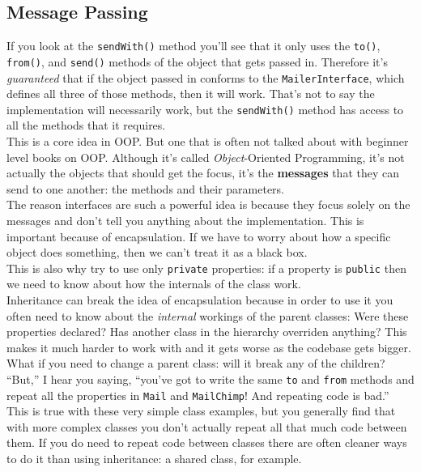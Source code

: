 \subsection{Message Passing}

If you look at the \texttt{sendWith()} method you'll see that it only uses the \texttt{to()}, \texttt{from()}, and \texttt{send()} methods of the object that gets passed in. Therefore it's \textit{guaranteed} that if the object passed in conforms to the \texttt{MailerInterface}, which defines all three of those methods, then it will work. That's not to say the implementation will necessarily work, but the \texttt{sendWith()} method has access to all the methods that it requires.
\\

This is a core idea in OOP. But one that is often not talked about with beginner level books on OOP. Although it's called \textit{Object}-Oriented Programming, it's not actually the objects that should get the focus, it's the \textbf{messages} that they can send to one another: the methods and their parameters.
\\

The reason interfaces are such a powerful idea is because they focus solely on the messages and don't tell you anything about the implementation. This is important because of encapsulation. If we have to worry about how a specific object does something, then we can't treat it as a black box.
\\

This is also why try to use only \texttt{private} properties: if a property is \texttt{public} then we need to know about how the internals of the class work.
\\

Inheritance can break the idea of encapsulation because in order to use it you often need to know about the \textit{internal} workings of the parent classes: Were these properties declared? Has another class in the hierarchy overriden anything? This makes it much harder to work with and it gets worse as the codebase gets bigger. What if you need to change a parent class: will it break any of the children?
\\

``But,'' I hear you saying, ``you've got to write the same \texttt{to} and \texttt{from} methods and repeat all the properties in \texttt{Mail} and \texttt{MailChimp}! And repeating code is bad.''
\\

This is true with these very simple class examples, but you generally find that with more complex classes you don't actually repeat all that much code between them. If you do need to repeat code between classes there are often cleaner ways to do it than using inheritance: a shared class, for example.


